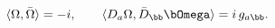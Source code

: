 \begin{equation}
 \langle \Omega,\bar{\Omega} \rangle = -i, \qquad \langle D_a
\Omega,\bar{D}_{\bb} \bOmega \rangle = i \, g_{a \bb}.
\end{equation}

